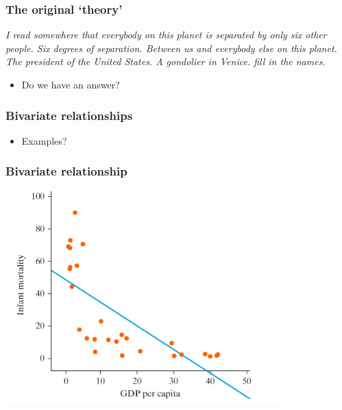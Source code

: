 \documentclass[aspectratio=43]{beamer}
\begin{document}
\begin{frame}
\frametitle{The original `theory'}
\centering

\textit{I read somewhere that everybody on this planet is separated by only six other people. Six degrees of separation. Between us and everybody else on this planet. The president of the United States. A gondolier in Venice. fill in the names.}\\\vspace{10pt}{\small Six Degrees of Separation, John Guare}

\vspace{20pt}

\begin{itemize}
  \item Do we have an answer?
\end{itemize}

\end{frame}

\begin{frame}
\frametitle{Bivariate relationships}
\centering

\begin{itemize}
  \item Examples?
\end{itemize}

\end{frame}

\begin{frame}
\frametitle{Bivariate relationship}
\centering

\includegraphics[width = 0.8\textwidth]{../img/scatter_GDP_mort}

\end{frame}
\end{document}

